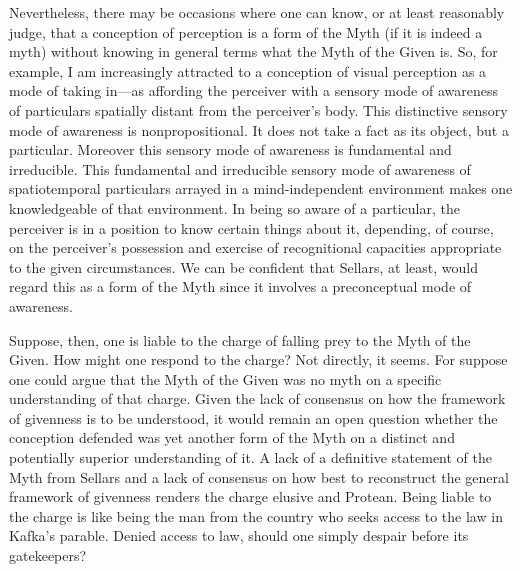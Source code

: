 \documentclass[12pt]{article}
\begin{document}
Nevertheless, there may be occasions where one can know, or at least reasonably judge, that a conception of perception is a form of the Myth (if it is indeed a myth) without knowing in general terms what the Myth of the Given is. So, for example, I am increasingly attracted to a conception of visual perception as a mode of taking in---as affording the perceiver with a sensory mode of awareness of particulars spatially distant from the perceiver's body. This distinctive sensory mode of awareness is nonpropositional. It does not take a fact as its object, but a particular. Moreover this sensory mode of awareness is fundamental and irreducible. This fundamental and irreducible sensory mode of awareness of spatiotemporal particulars arrayed in a mind-independent environment makes one knowledgeable of that environment. In being so aware of a particular, the perceiver is in a position to know certain things about it, depending, of course, on the perceiver's possession and exercise of recognitional capacities appropriate to the given circumstances. We can be confident that Sellars, at least, would regard this as a form of the Myth since it involves a preconceptual mode of awareness.

Suppose, then, one is liable to the charge of falling prey to the Myth of the Given. How might one respond to the charge? Not directly, it seems. For suppose one could argue that the Myth of the Given was no myth on a specific understanding of that charge. Given the lack of consensus on how the framework of givenness is to be understood, it would remain an open question whether the conception defended was yet another form of the Myth on a distinct and potentially superior understanding of it. A lack of a definitive statement of the Myth from Sellars and a lack of consensus on how best to reconstruct the general framework of givenness renders the charge elusive and Protean. Being liable to the charge is like being the man from the country who seeks access to the law in Kafka's parable. Denied access to law, should one simply despair before its gatekeepers?
\end{document}
